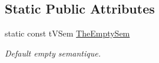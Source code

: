 \subsection*{Static Public Attributes}
\begin{DoxyCompactItemize}
\item 
static const t\+V\+Sem \hyperlink{classMMVII_1_1cSpecOneArg2007_a1e591f6be45029be7a657fabb4557208}{The\+Empty\+Sem}\hypertarget{classMMVII_1_1cSpecOneArg2007_a1e591f6be45029be7a657fabb4557208}{}\label{classMMVII_1_1cSpecOneArg2007_a1e591f6be45029be7a657fabb4557208}

\begin{DoxyCompactList}\small\item\em Default empty semantique. \end{DoxyCompactList}\end{DoxyCompactItemize}
